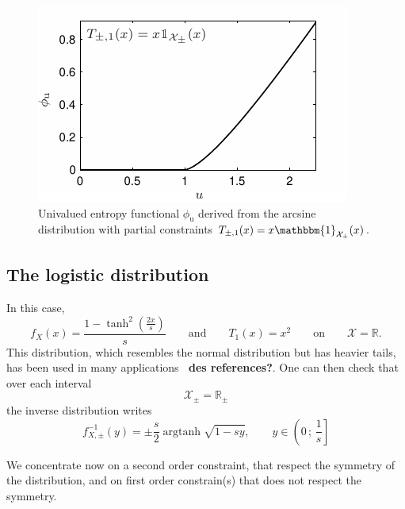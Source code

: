 \documentclass[entropy,article,submit,moreauthors,pdftex]{Definitions/mdpi}
\newcommand{\SZ}[1]{{\color{blue} #1}}                                       %
\newcommand{\Avoir}[1]{{\color{red}\bf #1}}                                  %
\def\Rset{\mathbb{R}}%
\def\X{\mathcal{X}}%
\def\un{\mathbbm{1}}%
\def\argtanh{\operatorname{argtanh}}%
\def\u{\mathrm{u}}
\begin{document}
\begin{figure}[htbp]
  \begin{minipage}{.6\columnwidth}
    \centerline{\includegraphics[width=.9\textwidth]{PDF/MaxEnt_ArcsineLaw}}
  \end{minipage}
  \begin{minipage}{.4\columnwidth}
\caption{\SZ{Univalued e}ntropy  functional   $\phi_\u$  derived  from   the  arcsine
  distribution with partial constraints $T_{\pm,1}(x) = x \un_{\X_\pm}(x)$.}
\label{fig:Entropy-arcsin}
  \end{minipage}
\end{figure}




\subsection{The logistic distribution}
\label{subsecapp:Logistic}

In this case, \SZ{
%
\[
f_X(x)  = \frac{1  -  \tanh^2\left(\frac{2 x}{s}\right)}{s} \qquad  \mbox{and}
\qquad T_1(x) = x^2 \qquad \mbox{on} \qquad \X = \Rset.
\]
}
This  distribution, which  resembles  the normal  distribution  but has  heavier
tails,   has    been   used   in   many    applications~\Avoir{\cite{toto}   des
  references?}. One can then check that over each interval
%
\[
\X_\pm = \Rset_\pm
\]
%
the inverse distribution writes \SZ{
%
\[
f_{X,\pm}^{-1}(y) = \pm \frac{s}{2} \argtanh \sqrt{1 - s y}, \qquad y \in \left( 0 \, ; \,
  \frac{1}{s} \right]
\]
}

We concentrate  now on a second  order constraint, that respect  the symmetry of
the distribution,  and on  first order  constrain(s) that  does not  respect the
symmetry.
\end{document}
